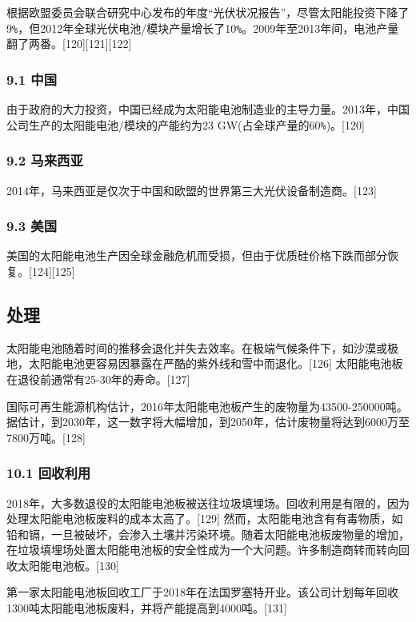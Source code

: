 根据欧盟委员会联合研究中心发布的年度“光伏状况报告”，尽管太阳能投资下降了9\verb`%`，但2012年全球光伏电池/模块产量增长了10\verb`%`。2009年至2013年间，电池产量翻了两番。[120][121][122]

\subsubsection{9.1 中国}

由于政府的大力投资，中国已经成为太阳能电池制造业的主导力量。2013年，中国公司生产的太阳能电池/模块的产能约为23 GW(占全球产量的60\verb`%`)。[120]

\subsubsection{9.2 马来西亚}

2014年，马来西亚是仅次于中国和欧盟的世界第三大光伏设备制造商。[123]

\subsubsection{9.3 美国}

美国的太阳能电池生产因全球金融危机而受损，但由于优质硅价格下跌而部分恢复。[124][125]

\subsection{处理}

太阳能电池随着时间的推移会退化并失去效率。在极端气候条件下，如沙漠或极地，太阳能电池更容易因暴露在严酷的紫外线和雪中而退化。[126] 太阳能电池板在退役前通常有25-30年的寿命。[127]

国际可再生能源机构估计，2016年太阳能电池板产生的废物量为43500-250000吨。据估计，到2030年，这一数字将大幅增加，到2050年，估计废物量将达到6000万至7800万吨。[128]

\subsubsection{10.1 回收利用}

2018年，大多数退役的太阳能电池板被送往垃圾填埋场。回收利用是有限的，因为处理太阳能电池板废料的成本太高了。[129] 然而，太阳能电池含有有毒物质，如铅和镉，一旦被破坏，会渗入土壤并污染环境。随着太阳能电池板废物量的增加，在垃圾填埋场处置太阳能电池板的安全性成为一个大问题。许多制造商转而转向回收太阳能电池板。[130]

第一家太阳能电池板回收工厂于2018年在法国罗塞特开业。该公司计划每年回收1300吨太阳能电池板废料，并将产能提高到4000吨。[131]


